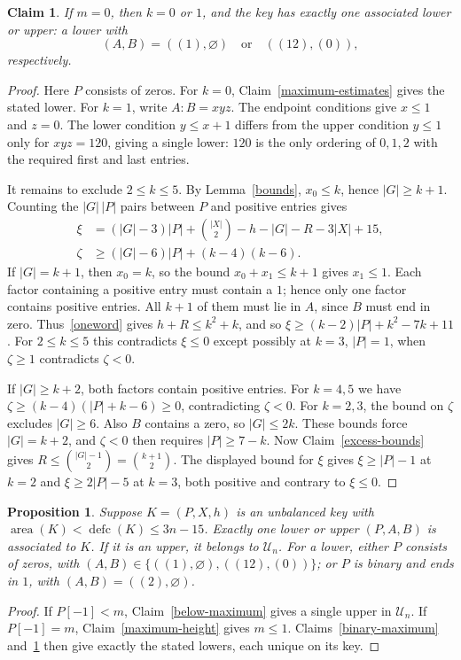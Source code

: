 \documentclass[11pt]{article}
\DeclareMathOperator{\area}{area}\DeclareMathOperator{\dinv}{dinv}
\DeclareMathOperator{\defc}{defc}\DeclareMathOperator{\sym}{sym}
\newtheorem{proposition}[theorem]{Proposition}
\newtheorem{claim}{Claim}
\begin{document}
\begin{claim}\label{zero-maximum}
If $m=0$, then $k=0$ or $1$, and the key has exactly one associated lower or upper: a lower with
\[
 (A,B)=((1),\varnothing)\quad\text{or}\quad((12),(0)),
\]
respectively.
\end{claim}
\begin{proof}
Here $P$ consists of zeros. For $k=0$, Claim~\ref{maximum-estimates} gives the stated lower. For $k=1$, write $A:B=xyz$. The endpoint conditions give $x\le1$ and $z=0$. The lower condition $y\le x+1$ differs from the upper condition $y\le1$ only for $xyz=120$, giving a single lower: $120$ is the only ordering of $0,1,2$ with the required first and last entries.

It remains to exclude $2\le k\le5$. By Lemma~\ref{bounds}, $x_0\le k$, hence $|G|\ge k+1$. Counting the $|G|\,|P|$ pairs between $P$ and positive entries gives
\begin{align*}
 \xi&=(|G|-3)|P|+\binom{|X|}{2}-h-|G|-R-3|X|+15,\\
 \zeta&\ge(|G|-6)|P|+(k-4)(k-6).
\end{align*}
If $|G|=k+1$, then $x_0=k$, so the bound $x_0+x_1\le k+1$ gives $x_1\le1$. Each factor containing a positive entry must contain a $1$; hence only one factor contains positive entries. All $k+1$ of them must lie in $A$, since $B$ must end in zero. Thus~\eqref{oneword} gives $h+R\le k^2+k$, and so $\xi\ge(k-2)|P|+k^2-7k+11$. For $2\le k\le5$ this contradicts $\xi\le0$ except possibly at $k=3$, $|P|=1$, when $\zeta\ge1$ contradicts $\zeta<0$.

If $|G|\ge k+2$, both factors contain positive entries. For $k=4,5$ we have $\zeta\ge(k-4)(|P|+k-6)\ge0$, contradicting $\zeta<0$. For $k=2,3$, the bound on $\zeta$ excludes $|G|\ge6$. Also $B$ contains a zero, so $|G|\le2k$. These bounds force $|G|=k+2$, and $\zeta<0$ then requires $|P|\ge7-k$. Now Claim~\ref{excess-bounds} gives $R\le\binom{|G|-1}2=\binom{k+1}2$. The displayed bound for $\xi$ gives $\xi\ge |P|-1$ at $k=2$ and $\xi\ge2|P|-5$ at $k=3$, both positive and contrary to $\xi\le0$.
\end{proof}

\begin{proposition}\label{exceptions}
Suppose $K=(P,X,h)$ is an unbalanced key with $\area(K)<\defc(K)\le3n-15$. Exactly one lower or upper $(P,A,B)$ is associated to $K$. If it is an upper, it belongs to $\mathcal U_n$. For a lower, either $P$ consists of zeros, with $(A,B)\in\{((1),\varnothing),((12),(0))\}$; or $P$ is binary and ends in $1$, with $(A,B)=((2),\varnothing)$.
\end{proposition}
\begin{proof}
If $P[-1]<m$, Claim~\ref{below-maximum} gives a single upper in $\mathcal U_n$. If $P[-1]=m$, Claim~\ref{maximum-height} gives $m\le1$. Claims~\ref{binary-maximum} and~\ref{zero-maximum} then give exactly the stated lowers, each unique on its key.
\end{proof}
\end{document}
